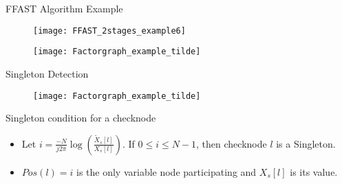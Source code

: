 	
	
	
	\begin{frame}{FFAST Algorithm Example}
	
	\begin{figure}[t]
		\centering
		\texttt{[image: FFAST\_2stages\_example6]}
	\end{figure}
	\vspace*{-4mm}
	\begin{figure}[t]
		\texttt{[image: Factorgraph\_example\_tilde]}
	\end{figure}
	
	\end{frame}
	\begin{frame}{Singleton Detection}
			
		
			\vspace{-5pt}
			\begin{figure}[t]
				
				\texttt{[image: Factorgraph\_example\_tilde]}
			\end{figure}
			\begin{block}{Singleton condition for a checknode}
			\begin{itemize}
				\item Let $i=\frac{-N}{j2\pi} \log(\frac{\tilde{X}_s[l]}{X_s[l]})$. If {\color{blue} $0 \leq i \leq N-1$}, then checknode $l$ is a \alert{Singleton}.\\
				\item $Pos(l) = i$ is the only variable node participating and $X_s[l]$ is its value.
			\end{itemize}
				
			\end{block}
			
	\end{frame}	

